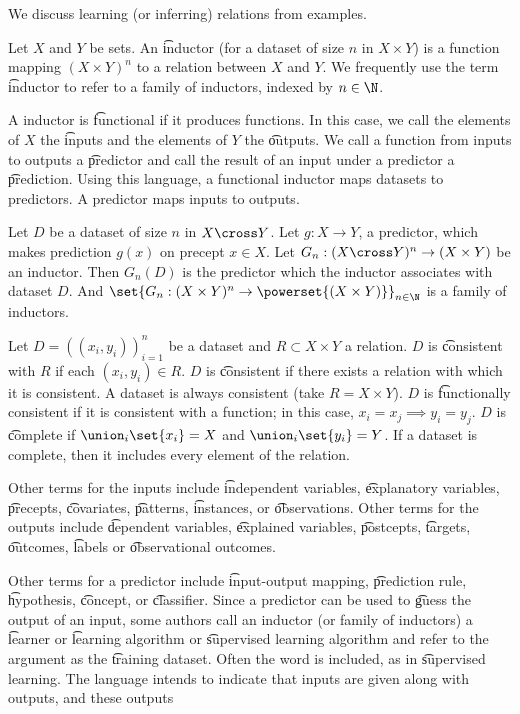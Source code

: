 

We discuss learning (or inferring) relations from examples.


Let $X$ and $Y$ be sets.
An \t{inductor} (for a dataset of size $n$ in $X \times Y$) is a function mapping $(X \times Y)^n$ to a relation between $X$ and $Y$.
We frequently use the term \t{inductor} to refer to a family of inductors, indexed by $n \in \N$.

A inductor is \t{functional} if it produces functions.
In this case, we call the elements of $X$ the \t{inputs} and the elements of $Y$ the \t{outputs}.
We call a function from inputs to outputs a \t{predictor}    and call the result of an input under a predictor a \t{prediction}.
Using this language, a functional inductor maps datasets to predictors.
A predictor maps inputs to outputs.


Let $D$ be a dataset of size $n$ in $X \cross Y$.
Let $g: X \to Y$, a predictor, which makes prediction $g(x)$ on precept $x \in X$.
Let $G_n: (X \cross Y)^n \to (X \times Y)$ be an inductor.
Then $G_n(D)$ is the predictor which the inductor associates with dataset $D$.
And $\set{G_n: (X \times Y)^n \to \powerset{(X \times Y)}}_{n \in \N}$ is a family of inductors.


Let $D = ((x_i, y_i))_{i =1}^{n}$ be a dataset and $R \subset X \times Y$ a relation.
$D$ is \t{consistent with $R$} if each $(x_i, y_i) \in R$.
$D$ is \t{consistent} if there exists a relation with which it is consistent.
A dataset is always consistent (take $R = X \times Y$).
$D$ is \t{functionally consistent} if it is consistent with a function; in this case, $x_i = x_j \implies y_i = y_j$.
$D$ is \t{complete} if $\union_i\set{x_i} = X$ and $\union_i\set{y_i} = Y$.
If a dataset is complete, then it includes every element of the relation.


Other terms for the inputs include \t{independent variables}, \t{explanatory variables}, \t{precepts}, \t{covariates}, \t{patterns}, \t{instances}, or \t{observations}.
Other terms for the outputs include \t{dependent variables}, \t{explained variables}, \t{postcepts}, \t{targets}, \t{outcomes}, \t{labels} or \t{observational outcomes}.

Other terms for a predictor include \t{input-output} mapping, \t{prediction rule}, \t{hypothesis}, \t{concept}, or \t{classifier}.
Since a predictor can be used to \t{guess} the output of an input, some authors call an inductor (or family of inductors) a \t{learner} or \t{learning algorithm} or \t{supervised learning algorithm} and refer to the argument as the \t{training dataset}.
Often the word  is included, as in \t{supervised learning}.
The language intends to indicate that inputs are given along with outputs, and these outputs 
